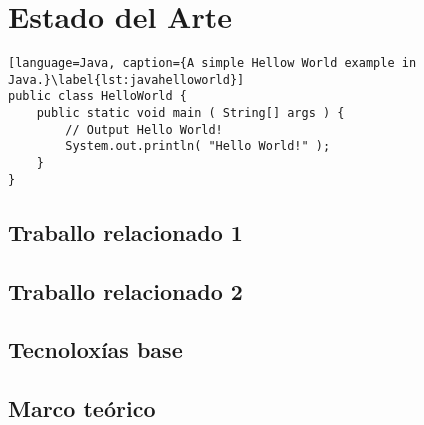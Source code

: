 
\chapter{Estado del Arte} %
\label{sec:related}


{
\color{gray}
\Blindtext[2][1]
}

\begin{lstlisting}[language=Java, caption={A simple Hellow World example in Java.}\label{lst:javahelloworld}]
public class HelloWorld {
	public static void main ( String[] args ) {
		// Output Hello World!
		System.out.println( "Hello World!" );
	}
}
\end{lstlisting}

{
\color{gray}
\Blindtext[1][1]
}

\section{Traballo relacionado 1}
\label{sec:related:sec1}

{
\color{gray}
\Blindtext[2][2]
}

\section{Traballo relacionado 2}
\label{sec:related:sec2}
{
\color{gray}
\Blindtext[3][2]
}

\section{Tecnoloxías base}
\label{sec:related:sec3}
{
\color{gray}
\Blindtext[4][2]
}

\section{Marco teórico}
\label{sec:related:conclusion}
{
\color{gray}
\Blindtext[2][1]
}